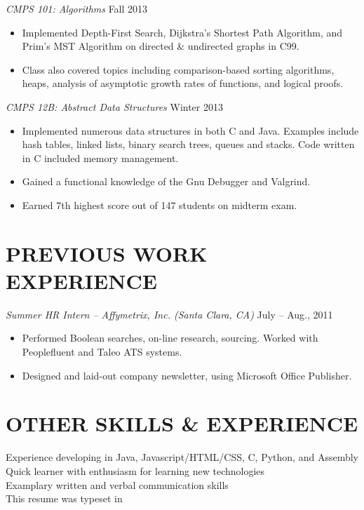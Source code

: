 \documentclass[margin]{res}
\begin{document}
\begin{resume}
                {\sl CMPS 101: Algorithms} \hfill Fall 2013\\
                \begin{itemize}  \itemsep -2pt %
		        \item Implemented Depth-First Search, Dijkstra’s Shortest Path Algorithm, and Prim’s MST Algorithm on
			directed \& undirected graphs in C99.
			\item Class also covered topics including comparison-based sorting algorithms, heaps, analysis of
			asymptotic growth rates of functions, and logical proofs. 
                \end{itemize} 

                {\sl CMPS 12B: Abstract Data Structures} \hfill Winter 2013\\
                \begin{itemize} \itemsep -2pt
                	\item Implemented numerous data structures in both C and Java. Examples include hash tables, linked
			lists, binary search trees, queues and stacks. Code written in C included memory management.
			\item Gained a functional knowledge of the Gnu Debugger and Valgrind.
			\item Earned 7th highest score out of 147 students on midterm exam. 
                \end{itemize} 
\section{PREVIOUS WORK EXPERIENCE}
                {\sl Summer HR Intern – Affymetrix, Inc. (Santa Clara, CA)} \hfill July – Aug., 2011 \\
			\begin{itemize} \itemsep -2pt
			\item Performed Boolean searches, on-line research, sourcing. Worked with Peoplefluent and Taleo
			ATS systems.
			\item Designed and laid-out company newsletter, using Microsoft Office Publisher.
			\end{itemize}
\section{OTHER SKILLS \& EXPERIENCE}
		Experience developing in Java, Javascript\slash HTML\slash CSS, C, Python, and Assembly\\
		Quick learner with enthusiasm for learning new technologies\\
		Examplary written and verbal communication skills\\
		This resume was typeset in \LaTeXe

\end{resume}
\end{document}
